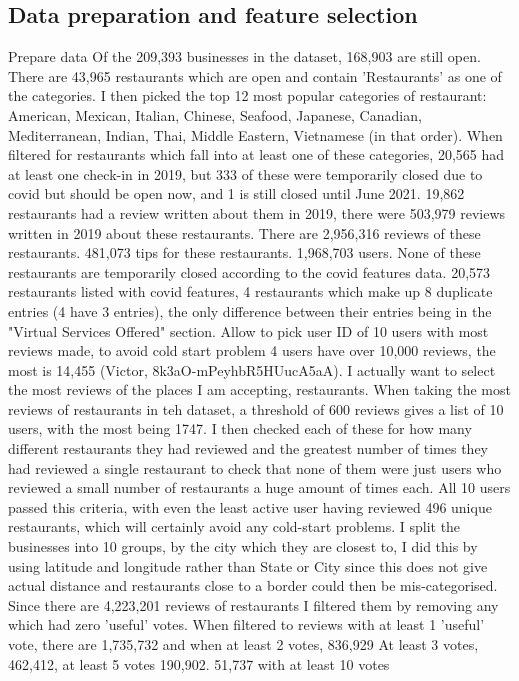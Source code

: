 \documentclass[conference]{IEEEtran}
\begin{document}
\subsection{Data preparation and feature selection}
Prepare data
Of the 209,393 businesses in the dataset, 168,903 are still open. 
There are 43,965 restaurants which are open and contain 'Restaurants' as one of the categories. 
I then picked the top 12 most popular categories of restaurant: American, Mexican, Italian, Chinese, 
Seafood, Japanese, Canadian, Mediterranean, Indian, Thai, Middle Eastern, Vietnamese (in that order). 
When filtered for restaurants which fall into at least one of these categories, 
20,565 had at least one check-in in 2019, but 333 of these were temporarily closed due to covid but should be 
open now, and 1 is still closed until June 2021. 
19,862 restaurants had a review written about them in 2019, there were 503,979 reviews written in 2019 about these restaurants. 
There are 2,956,316 reviews of these restaurants. 
481,073 tips for these restaurants. 
1,968,703 users. 
None of these restaurants are temporarily closed according to the covid features data. 
20,573 restaurants listed with covid features, 4 restaurants which make up 8 duplicate entries 
(4 have 3 entries), the only difference between their entries being in the 
"Virtual Services Offered" section. 
Allow to pick user ID of 10 users with most reviews made, to avoid cold start problem
4 users have over 10,000 reviews, the most is 14,455 (Victor, 8k3aO-mPeyhbR5HUucA5aA). 
I actually want to select the most reviews of the places I am accepting, restaurants. 
When taking the most reviews of restaurants in teh dataset, a threshold of 600 reviews gives a list of 10 users, 
with the most being 1747. 
I then checked each of these for how many different restaurants they had reviewed and the greatest number of times 
they had reviewed a single restaurant to check that none of them were just users who reviewed a small number of 
restaurants a huge amount of times each. 
All 10 users passed this criteria, with even the least active user having reviewed 496 unique restaurants, which will 
certainly avoid any cold-start problems. 
I split the businesses into 10 groups, by the city which they are closest to, I did this by using latitude and 
longitude rather than State or City since this does not give actual distance and restaurants close to a border 
could then be mis-categorised. 
Since there are 4,223,201 reviews of restaurants I filtered them by removing any which had zero 'useful' votes. 
When filtered to reviews with at least 1 'useful' vote, there are 1,735,732 and when at least 2 votes, 836,929
At least 3 votes, 462,412, at least 5 votes 190,902. 
51,737 with at least 10 votes
\end{document}
